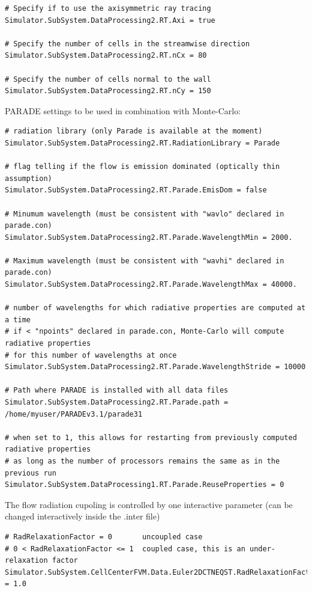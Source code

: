 \documentclass[11pt]{article}
\begin{document}
\begin{verbatim}
# Specify if to use the axisymmetric ray tracing
Simulator.SubSystem.DataProcessing2.RT.Axi = true

# Specify the number of cells in the streamwise direction
Simulator.SubSystem.DataProcessing2.RT.nCx = 80

# Specify the number of cells normal to the wall
Simulator.SubSystem.DataProcessing2.RT.nCy = 150
\end{verbatim}

PARADE settings to be used in combination with Monte-Carlo:

\begin{verbatim}
# radiation library (only Parade is available at the moment)
Simulator.SubSystem.DataProcessing2.RT.RadiationLibrary = Parade

# flag telling if the flow is emission dominated (optically thin assumption) 
Simulator.SubSystem.DataProcessing2.RT.Parade.EmisDom = false

# Minumum wavelength (must be consistent with "wavlo" declared in parade.con) 
Simulator.SubSystem.DataProcessing2.RT.Parade.WavelengthMin = 2000.

# Maximum wavelength (must be consistent with "wavhi" declared in parade.con) 
Simulator.SubSystem.DataProcessing2.RT.Parade.WavelengthMax = 40000.

# number of wavelengths for which radiative properties are computed at a time
# if < "npoints" declared in parade.con, Monte-Carlo will compute radiative properties
# for this number of wavelengths at once 
Simulator.SubSystem.DataProcessing2.RT.Parade.WavelengthStride = 10000

# Path where PARADE is installed with all data files
Simulator.SubSystem.DataProcessing2.RT.Parade.path = /home/myuser/PARADEv3.1/parade31

# when set to 1, this allows for restarting from previously computed radiative properties
# as long as the number of processors remains the same as in the previous run 
Simulator.SubSystem.DataProcessing1.RT.Parade.ReuseProperties = 0
\end{verbatim}

The flow radiation cupoling is controlled by one interactive parameter (can be changed interactively inside the .inter file)

\begin{verbatim}
# RadRelaxationFactor = 0       uncoupled case
# 0 < RadRelaxationFactor <= 1  coupled case, this is an under-relaxation factor    
Simulator.SubSystem.CellCenterFVM.Data.Euler2DCTNEQST.RadRelaxationFactor = 1.0
\end{verbatim}
\end{document}
